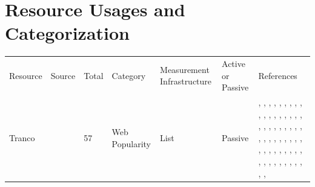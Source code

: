 \documentclass[11pt,a4paper]{article}
\begin{document}
\section{Resource Usages and Categorization}
\begin{longtable}{@{}p{}p{}p{}p{}p{}p{}p{}@{}}
\hline
Resource & Source & Total & Category & Measurement Infrastructure & Active or Passive & References \\
Tranco & \cite{10.14722/ndss.2019.23386} & 57 & Web Popularity & List & Passive & \cite{10.1145/3730567.3764500}, \cite{10.1145/3730567.3732921}, \cite{10.1145/3730567.3764490}, \cite{10.1145/3730567.3764501}, \cite{10.1145/3730567.3732913}, \cite{10.1145/3730567.3764507}, \cite{10.1145/3730567.3764427}, \cite{10.1145/3646547.3689014}, \cite{10.1145/3646547.3688410}, \cite{10.1145/3646547.3688449}, \cite{10.1145/3646547.3688444}, \cite{10.1145/3618257.3624821}, \cite{10.1145/3618257.3624844}, \cite{10.1145/3618257.3624835}, \cite{10.1145/3618257.3624842}, \cite{10.1145/3618257.3624795}, \cite{10.1145/3618257.3624817}, \cite{10.1145/3618257.3624797}, \cite{10.1145/3517745.3561457}, \cite{10.1145/3517745.3561445}, \cite{10.1145/3517745.3561437}, \cite{10.1145/3517745.3561415}, \cite{10.1145/3517745.3561446}, \cite{10.1145/3517745.3561453}, \cite{10.1145/3517745.3561444}, \cite{10.1145/3517745.3561460}, \cite{10.1145/3487552.3487843}, \cite{10.1145/3487552.3487857}, \cite{10.1145/3487552.3487850}, \cite{10.1145/3487552.3487855}, \cite{10.1145/3487552.3487836}, \cite{10.1007/978-3-030-72582-2_26}, \cite{10.1007/978-3-030-72582-2_33}, \cite{10.1007/978-3-030-98785-5_19}, \cite{10.1007/978-3-031-28486-1_6}, \cite{10.1007/978-3-031-28486-1_20}, \cite{10.1007/978-3-031-28486-1_26}, \cite{10.1007/978-3-031-56249-5_5}, \cite{10.1007/978-3-031-56249-5_10}, \cite{10.1007/978-3-031-85960-1_3}, \cite{10.1007/978-3-031-85960-1_5}, \cite{10.1007/978-3-031-85960-1_15}, \cite{10.1145/3777912.3809148}, \cite{10.1145/3777912.3809141}, \cite{10.1145/3777912.3839787}, \cite{10.1145/3777912.3839832}, \cite{10.1007/978-3-032-18268-5_1}, \cite{10.1007/978-3-032-18268-5_5}, \cite{10.1007/978-3-032-18268-5_15}, \cite{10.1145/3777912.3839825}, \cite{10.1145/3777912.3839806}, \cite{10.1145/3777912.3839801}, \cite{10.1145/3777912.3839807}, \cite{10.1145/3777912.3809157}, \cite{10.1145/3777912.3839800}, \cite{10.1145/3777912.3839812}, \cite{10.1145/3777912.3809147} \\

\end{longtable}
\end{document}

